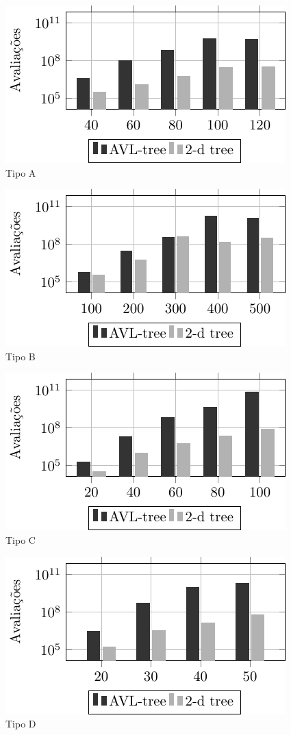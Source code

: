 \centering
\begin{subfigure}{.5\textwidth}
  \centering
  \includegraphics[scale=1.1]{tab/cmp/2dimA}
  \caption{Tipo A}
  \label{fig:sub1}
\end{subfigure}%
\begin{subfigure}{.5\textwidth}
  \centering
  \includegraphics[scale=1.1]{tab/cmp/2dimB}
  \caption{Tipo B}
  \label{fig:sub2}
\end{subfigure}
\begin{subfigure}{.5\textwidth}
  \centering
  \includegraphics[scale=1.1]{tab/cmp/2dimC}
  \caption{Tipo C}
  \label{fig:sub3}
\end{subfigure}%
\begin{subfigure}{.5\textwidth}
  \centering
  \includegraphics[scale=1.1]{tab/cmp/2dimD}
  \caption{Tipo D}
  \label{fig:sub4}
\end{subfigure}